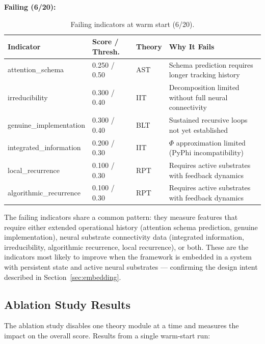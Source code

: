 \textbf{Failing (6/20):}

\begin{table}[t]
\centering
\small
\begin{tabular}{lllp{5.5cm}}
\toprule
Indicator & Score / Thresh. & Theory & Why It Fails \\
\midrule
attention\_schema & 0.250 / 0.50 & AST & Schema prediction requires longer tracking history \\
irreducibility & 0.300 / 0.40 & IIT & Decomposition limited without full neural connectivity \\
genuine\_implementation & 0.300 / 0.40 & BLT & Sustained recursive loops not yet established \\
integrated\_information & 0.200 / 0.30 & IIT & $\Phi$ approximation limited (PyPhi incompatibility) \\
local\_recurrence & 0.100 / 0.30 & RPT & Requires active substrates with feedback dynamics \\
algorithmic\_recurrence & 0.100 / 0.30 & RPT & Requires active substrates with feedback dynamics \\
\bottomrule
\end{tabular}
\caption{Failing indicators at warm start (6/20).}
\label{tab:failing-indicators}
\end{table}

The failing indicators share a common pattern: they measure features that require either extended operational history (attention schema prediction, genuine implementation), neural substrate connectivity data (integrated information, irreducibility, algorithmic recurrence, local recurrence), or both. These are the indicators most likely to improve when the framework is embedded in a system with persistent state and active neural substrates --- confirming the design intent described in Section~\ref{sec:embedding}.

\subsection{Ablation Study Results}
\label{sec:ablation}

The ablation study disables one theory module at a time and measures the impact on the overall score. Results from a single warm-start run:

